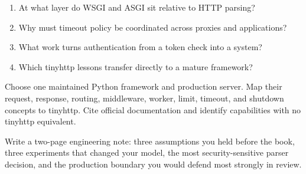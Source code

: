 \reviewtitle
\begin{enumerate}
  \item At what layer do WSGI and ASGI sit relative to HTTP parsing?
  \item Why must timeout policy be coordinated across proxies and applications?
  \item What work turns authentication from a token check into a system?
  \item Which tinyhttp lessons transfer directly to a mature framework?
\end{enumerate}

\begin{exercise}
Choose one maintained Python framework and production server. Map their request,
response, routing, middleware, worker, limit, timeout, and shutdown concepts to
tinyhttp. Cite official documentation and identify capabilities with no tinyhttp
equivalent.
\end{exercise}

\begin{exercise}
Write a two-page engineering note: three assumptions you held before the book,
three experiments that changed your model, the most security-sensitive parser
decision, and the production boundary you would defend most strongly in review.
\end{exercise}

